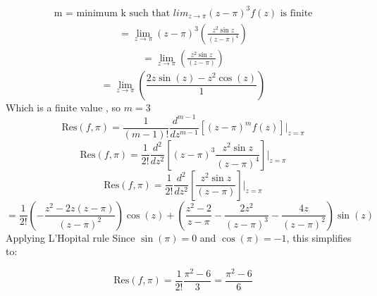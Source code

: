 \documentclass[journal,12pt,onecolumn]{IEEEtran}
\theoremstyle{remark}
\begin{document}
\begin{align}
\text{m = minimum k such that }  lim_{{z \to \pi}} (z-\pi)^3 f(z)\text{ is finite}
\end{align}
\begin{align}
= \lim_{{z \to \pi}} (z-\pi)^3 \left( \frac{{ z^2 \sin z}}{{(z-\pi)^4}} \right)
\end{align}
\begin{align}
= \lim_{{z \to \pi}}  \left( \frac{{ z^2 \sin z}}{{(z-\pi)}} \right)
\end{align}
\begin{equation}
= \lim_{{z \to \pi}}  \left( \frac{2z \sin(z) - z^2 \cos(z)}{1} \right)
\end{equation}
Which is a finite value , so $m = 3$
\begin{equation}
\text{Res}(f, \pi) = \frac{1}{(m-1)!} \frac{d^{m-1}}{dz^{m-1}} \left[ (z-\pi)^m f(z) \right] \Bigg|_{z=\pi}
\end{equation}
\begin{equation}
\text{Res}(f,\pi) = \frac{1}{2!} \frac{d^2}{dz^2} \left[ (z-\pi)^3 \frac{z^2 \sin z}{(z-\pi)^4} \right] \Bigg|_{z=\pi}
\end{equation}
\begin{equation}
\text{Res}(f,\pi) = \frac{1}{2!} \frac{d^2}{dz^2} \left[ \frac{z^2 \sin z}{(z-\pi)} \right] \Bigg|_{z=\pi}
\end{equation}
\begin{equation}
= \frac{1}{2!}\left(-\frac{z^2 - 2z(z-\pi)}{(z-\pi)^2}\right) \cos(z)+\left(\frac{z^2-2}{z-\pi}- \frac{2z^2}{(z-\pi)^3} - \frac{4z}{(z-\pi)^2}  \right) \sin(z)
\end{equation}
Applying L'Hopital rule
Since \( \sin(\pi) = 0 \) and \( \cos(\pi) = -1 \), this simplifies to:

\begin{equation}
\text{Res}(f,\pi) = \frac{1}{2!} \frac{\pi^2-6}{3} = \frac{\pi^2 - 6}{6} 
\end{equation}
\end{document}
